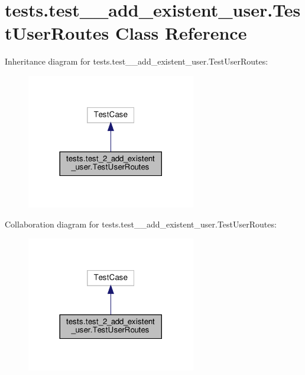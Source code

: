 \hypertarget{classtests_1_1test__2__add__existent__user_1_1_test_user_routes}{}\section{tests.\+test\+\_\+\_\+add\+\_\+existent\+\_\+user.\+Test\+User\+Routes Class Reference}
\label{classtests_1_1test__2__add__existent__user_1_1_test_user_routes}


Inheritance diagram for tests.\+test\+\_\+\_\+add\+\_\+existent\+\_\+user.\+Test\+User\+Routes\+:\nopagebreak
\begin{figure}[H]
\begin{center}
\leavevmode
\includegraphics[width=209pt]{classtests_1_1test__2__add__existent__user_1_1_test_user_routes__inherit__graph}
\end{center}
\end{figure}


Collaboration diagram for tests.\+test\+\_\+\_\+add\+\_\+existent\+\_\+user.\+Test\+User\+Routes\+:\nopagebreak
\begin{figure}[H]
\begin{center}
\leavevmode
\includegraphics[width=209pt]{classtests_1_1test__2__add__existent__user_1_1_test_user_routes__coll__graph}
\end{center}
\end{figure}
